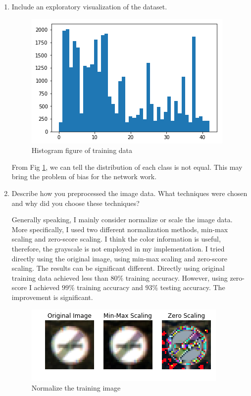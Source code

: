\documentclass[paper=a4, fontsize=11pt]{scrartcl}
\numberwithin{equation}{section}		%
\numberwithin{figure}{section}			%
\numberwithin{table}{section}				%
\begin{document}
\begin{enumerate}
\item Include an exploratory visualization of the dataset. 
\begin{figure}
  \centering
  \includegraphics[width=.8\linewidth]{datahist.png}
  \caption{Histogram figure of training data}
  \label{fig:datahist}
\end{figure}
From Fig \ref{fig:datahist}, we can tell the distribution of each class is not equal. This may bring the problem of bias for the network work.

\item Describe how you preprocessed the image data. What techniques were chosen and why did you choose these techniques?

Generally speaking, I mainly consider normalize or scale the image data. More specifically, I used two different normalization methods, min-max scaling and zero-score scaling. I think the color information is useful, therefore, the grayscale is not employed in my implementation. I tried directly using the original image, using min-max scaling and zero-score scaling. The results can be significant different. Directly using original training data achieved less than $80\%$ training accuracy. However, using zero-score I achieved $99\%$ training accuracy and $93\%$ testing accuracy. The improvement is significant.
\begin{figure}
  \centering
  \includegraphics[width=.8\linewidth]{normalization.png}
  \caption{Normalize the training image}
  \label{fig:normalization}
\end{figure} 


\end{enumerate}
\end{document}
